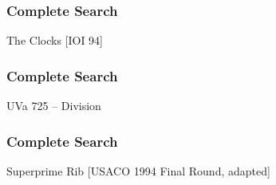 \begin{frame}
\frametitle{Complete Search}
\begin{block}{The Clocks [IOI 94]}
%
%
%
%
\end{block}
\end{frame}

\begin{frame}
\frametitle{Complete Search}
\begin{block}{UVa 725 -- Division}
\end{block}
\end{frame}

\begin{frame}
\frametitle{Complete Search}
\begin{block}{Superprime Rib [USACO 1994 Final Round, adapted]}
%
%
\end{block}
\end{frame}

